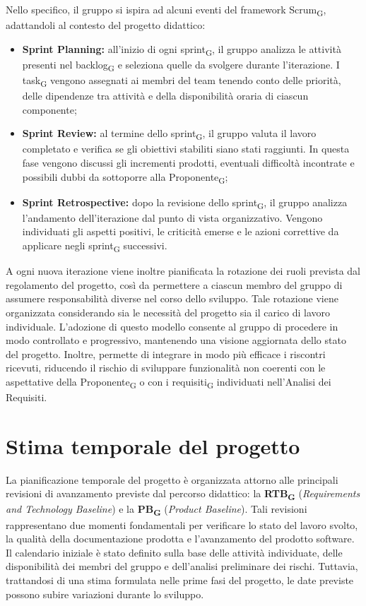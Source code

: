 \documentclass[a4paper, 10pt, colorlinks=true, linkcolor=black, urlcolor=blue, citecolor=blue, hidelinks]{article}
\begin{document}
Nello specifico, il gruppo si ispira ad alcuni eventi del framework Scrum\textsubscript{G}, adattandoli al contesto del progetto didattico:

\begin{itemize}
    \item \textbf{Sprint Planning:} all'inizio di ogni sprint\textsubscript{G}, il gruppo analizza le attività presenti nel backlog\textsubscript{G} e seleziona quelle da svolgere durante l'iterazione. I task\textsubscript{G} vengono assegnati ai membri del team tenendo conto delle priorità, delle dipendenze tra attività e della disponibilità oraria di ciascun componente;

    \item \textbf{Sprint Review:} al termine dello sprint\textsubscript{G}, il gruppo valuta il lavoro completato e verifica se gli obiettivi stabiliti siano stati raggiunti. In questa fase vengono discussi gli incrementi prodotti, eventuali difficoltà incontrate e possibili dubbi da sottoporre alla Proponente\textsubscript{G};

    \item \textbf{Sprint Retrospective:} dopo la revisione dello sprint\textsubscript{G}, il gruppo analizza l'andamento dell'iterazione dal punto di vista organizzativo. Vengono individuati gli aspetti positivi, le criticità emerse e le azioni correttive da applicare negli sprint\textsubscript{G} successivi.
\end{itemize}

A ogni nuova iterazione viene inoltre pianificata la rotazione dei ruoli prevista dal regolamento del progetto, così da permettere a ciascun membro del gruppo di assumere responsabilità diverse nel corso dello sviluppo. Tale rotazione viene organizzata considerando sia le necessità del progetto sia il carico di lavoro individuale.
L'adozione di questo modello consente al gruppo di procedere in modo controllato e progressivo, mantenendo una visione aggiornata dello stato del progetto. Inoltre, permette di integrare in modo più efficace i riscontri ricevuti, riducendo il rischio di sviluppare funzionalità non coerenti con le aspettative della Proponente\textsubscript{G} o con i requisiti\textsubscript{G} individuati nell'Analisi dei Requisiti.

\section{Stima temporale del progetto}
La pianificazione temporale del progetto è organizzata attorno alle principali revisioni di avanzamento previste dal percorso didattico: la \textbf{RTB\textsubscript{G}} (\textit{Requirements and Technology Baseline}) e la \textbf{PB\textsubscript{G}} (\textit{Product Baseline}). Tali revisioni rappresentano due momenti fondamentali per verificare lo stato del lavoro svolto, la qualità della documentazione prodotta e l'avanzamento del prodotto software.
Il calendario iniziale è stato definito sulla base delle attività individuate, delle disponibilità dei membri del gruppo e dell'analisi preliminare dei rischi. Tuttavia, trattandosi di una stima formulata nelle prime fasi del progetto, le date previste possono subire variazioni durante lo sviluppo.
\end{document}
